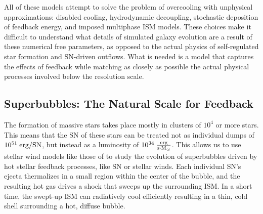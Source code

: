 All of these models attempt to solve the problem of overcooling with unphysical
approximations: disabled cooling, hydrodynamic decoupling, stochastic deposition
of feedback energy, and imposed multiphase ISM models.  These choices make it
difficult to understand what details of simulated galaxy evolution are a result
of these numerical free parameters, as opposed to the actual physics of
self-regulated star formation and SN-driven outflows.  What is needed is a model that
captures the effects of feedback while matching as closely as possible the
actual physical processes involved below the resolution scale.

\subsection{Superbubbles: The Natural Scale for Feedback}
The formation of massive stars takes place mostly in clusters of $10^4$ or more
stars.  This means that the SN of these stars can be treated not as individual
dumps of $10^{51}\;\rm{erg/SN}$, but instead as a luminosity of
$10^{34}\;\rm{\frac{erg}{s \cdot M_\odot}}$.  This allows us to use stellar wind
models like those of \citet{Weaver1977} to study the evolution of superbubbles driven by
hot stellar feedback processes, like SN or stellar winds.  Each individual SN's
ejecta thermalizes in a small region within the center of the bubble, and the
resulting hot gas drives a shock that sweeps up the surrounding ISM.  In a short
time, the swept-up ISM can radiatively cool efficiently resulting in a thin,
cold shell surrounding a hot, diffuse bubble.

